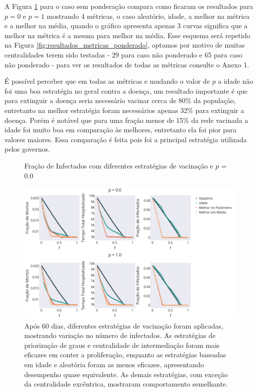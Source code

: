 A Figura \ref{fig:resultados_metricas} para o caso sem ponderação compara como ficaram os resultados para $p = 0$ e $p = 1$ mostrando 4 métricas, o caso aleatório, idade, a melhor na métrica e a melhor na média, quando o gráfico apresenta apenas 3 curvas significa que a melhor na métrica é a mesma para melhor na média. Esse esquema será repetido na Figura \ref{fig:resultados_metricas_ponderado}, optamos por motivo de muitas centralidades terem sido testadas - 29 para caso não ponderado e 65 para caso não ponderado - para ver os resultados de todas as métricas consulte o Anexo 1.

É possível perceber que em todas as métricas e mudando o valor de $p$ a idade não foi uma boa estratégia no geral contra a doença, um resultado importante é que para extinguir a doença seria necessário vacinar cerca de 80\% da população, entretanto na melhor estratégia foram necessários apenas 32\% para extinguir a doença. Porém é notável que para uma fração menor de 15\% da rede vacinada a idade foi muito boa em comparação às melhores, entretanto ela foi pior para valores maiores. Essa comparação é feita pois foi a principal estratégia utilizada pelos governos.

\begin{figure}[H]
    \centering
    \captionsetup{font=normalsize,skip=0.8pt,singlelinecheck=on,labelsep=endash}
    \caption{Fração de Infectados com diferentes estratégias de vacinação e $p$ = 0.0}
    \includegraphics[scale= 0.3]{figuras/cmpara_p_f.png}
    \captionsetup{font=small,justification=justified}
    
    \caption*{ Após 60 dias, diferentes estratégias de vacinação foram aplicadas, mostrando variação no número de infectados. As estratégias de priorização de graus e centralidade de intermediação foram mais eficazes em conter a proliferação, enquanto as estratégias baseadas em idade e aleatória foram as menos eficazes, apresentando desempenho quase equivalente. As demais estratégias, com exceção da centralidade excêntrica, mostraram comportamento semelhante.}
    \label{fig:resultados_metricas}
\end{figure}

